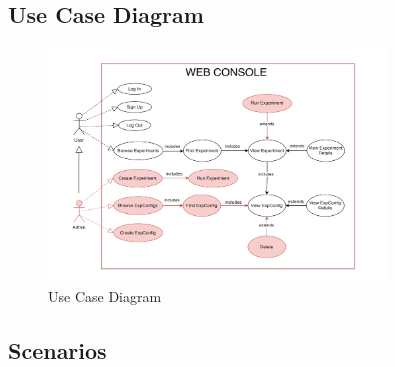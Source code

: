 \subsection{Use Case Diagram}

\begin{figure}[ht!]
    \centering
    \includegraphics[width=0.8\textwidth]{images/2_analisys/FL_class_diag.drawio.png}
    \caption{Use Case Diagram}
    \label{fig:use_case_diagram}
\end{figure}

\subsection{Scenarios}

